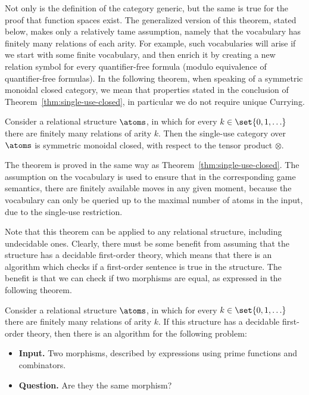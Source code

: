 Not only is the definition of the category generic, but the same is true for  the proof that function spaces exist. The generalized version of this theorem, stated below, makes only a relatively tame assumption, namely that the vocabulary has finitely many relations of each arity. For example, such vocabularies will arise if we start with some finite vocabulary, and then enrich it by creating a new relation symbol for every quantifier-free formula (modulo equivalence of quantifier-free formulas). In the following theorem, when speaking of a symmetric monoidal closed category, we mean that properties stated in the conclusion of Theorem~\ref{thm:single-use-closed}, in particular we do not require unique Currying.



\begin{theorem}\label{thm:single-use-closed-relational-structures}
    Consider a relational structure $\atoms$, in which for every $k \in \set{0,1,\ldots}$ there are finitely many relations of arity $k$. Then the single-use category over $\atoms$ is symmetric monoidal closed, with respect to the tensor product $\otimes$.
\end{theorem}

The theorem is proved in the same way as Theorem~\ref{thm:single-use-closed}.  The assumption on the vocabulary is used to ensure that in the corresponding game semantics, there are finitely available moves in any given moment, because the vocabulary can only be queried up to the maximal number of atoms in the input, due to the single-use restriction.

Note that this  theorem can be applied to any relational structure, including undecidable ones. Clearly, there must be some benefit from assuming that the structure has a decidable first-order theory, which means that there is an algorithm which checks if a first-order sentence is true in the structure. 
The benefit is that we can check if two morphisms are equal, as expressed in the following theorem. 

\begin{theorem}\label{thm:first-order-decidable}
    Consider a relational structure $\atoms$, in which for every $k \in \set{0,1,\ldots}$ there are finitely many relations of arity $k$. If this structure has a decidable first-order theory, then there is an algorithm for the following problem:
    \begin{itemize}
        \item {\bf Input.} Two morphisms, described by expressions using prime functions and combinators.
        \item {\bf Question.} Are they the same morphism?
    \end{itemize}
\end{theorem}




